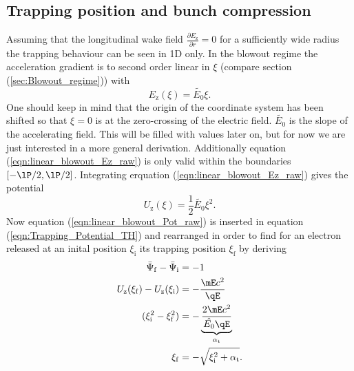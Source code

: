 \subsection{Trapping position and bunch compression}
\label{sec:Trap_pos_bunch_comp}
Assuming that the longitudinal wake field 
$\frac{\partial E_\mathrm{z}}{\partial r} = 0 $ for a sufficiently wide radius the trapping behaviour can be seen in 1D only.
In the blowout regime the acceleration gradient is to second order linear in $\xi$ (compare section (\ref{sec:Blowout_regime})) with
\begin{equation}
\label{eqn:linear_blowout_Ez_raw}
E_\mathrm{z}(\xi)=\tilde{E_0}\xi.
\end{equation}
One should keep in mind that the origin of the coordinate system has been shifted so that $\xi=0$ is at the zero-crossing of the electric field. $\tilde{E_0}$ is the slope of the accelerating field. This will be filled with values later on, but for now we are just interested in a more general derivation. Additionally equation (\ref{eqn:linear_blowout_Ez_raw}) is only valid within the boundaries $[-\lP/2,\lP/2]$.
Integrating erquation (\ref{eqn:linear_blowout_Ez_raw}) gives the potential
\begin{equation}
\label{eqn:linear_blowout_Pot_raw}
U_\mathrm{z}(\xi)=\frac{1}{2}\tilde{E_0}\xi^2.
\end{equation}
Now equation (\ref{eqn:linear_blowout_Pot_raw}) is inserted in equation (\ref{eqn:Trapping_Potential_TH}) and rearranged in order to find for an electron released at an inital position $\xi_\mathrm{i}$ its trapping position $\xi_\mathrm{f}$ by deriving
\begin{align}
\bar{\Psi}_\mathrm{f}-\bar{\Psi}_\mathrm{i}&=-1\\
U_\mathrm{z}(\xi_\mathrm{f})-U_\mathrm{z}(\xi_\mathrm{i})&=-\frac{\mE c^2}{\qE}\\
(\xi_\mathrm{i}^2-\xi_\mathrm{f}^2)&=-\underbrace{\frac{2\mE c^2}{\hat{E_0}\qE}}_{\alpha_\mathrm{t}}\\
\label{eqn:Trapping_Position}
\xi_\mathrm{f}&=-\sqrt{\xi_\mathrm{i}^2+\alpha_\mathrm{t}}.
\end{align}

